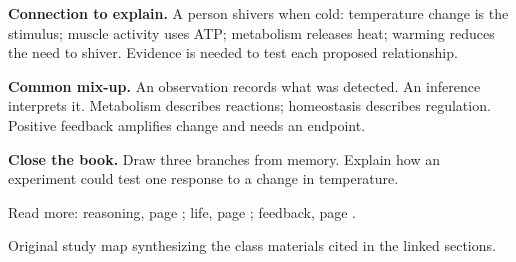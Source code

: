 \documentclass[11pt,letterpaper]{article}
\begin{document}
\par
\textbf{Connection to explain.} A person shivers when cold: temperature change is the stimulus; muscle activity uses ATP; metabolism releases heat; warming reduces the need to shiver. Evidence is needed to test each proposed relationship.
\par
\textbf{Common mix-up.} An observation records what was detected. An inference interprets it. Metabolism describes reactions; homeostasis describes regulation. Positive feedback amplifies change and needs an endpoint.
\par
\textbf{Close the book.} Draw three branches from memory. Explain how an experiment could test one response to a change in temperature.
\par
{\small Read more: reasoning, page \pageref{onea}; life, page \pageref{lifecheck}; feedback, page \pageref{feedback}.\par}
{\footnotesize Original study map synthesizing the class materials cited in the linked sections.\par}
\end{document}
